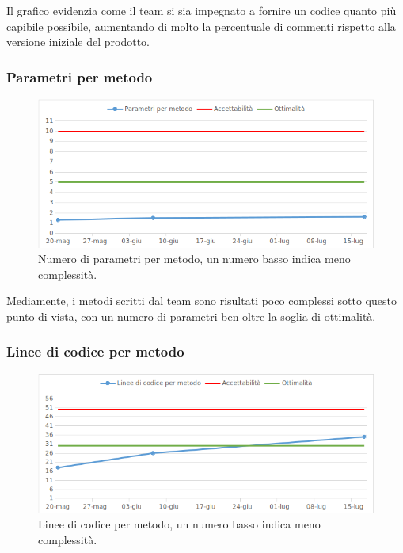 Il grafico evidenzia come il team si sia impegnato a fornire un codice quanto più capibile possibile, aumentando di molto la percentuale di commenti rispetto alla versione iniziale del prodotto.

\newpage

\subsubsection{Parametri per metodo}

\begin{figure}[h!]
	\centering
	\includegraphics[scale=0.75]{img/Grafici/param_metodo.png}
	\caption{Numero di parametri per metodo, un numero basso indica meno complessità.}
	\label{fig:param_metodo}
\end{figure}

Mediamente, i metodi scritti dal team sono risultati poco complessi sotto questo punto di vista, con un numero di parametri ben oltre la soglia di ottimalità.

\subsubsection{Linee di codice per metodo}

\begin{figure}[h!]
	\centering
	\includegraphics[scale=0.75]{img/Grafici/Linee_metodo.png}
	\caption{Linee di codice per metodo, un numero basso indica meno complessità.}
\end{figure}

